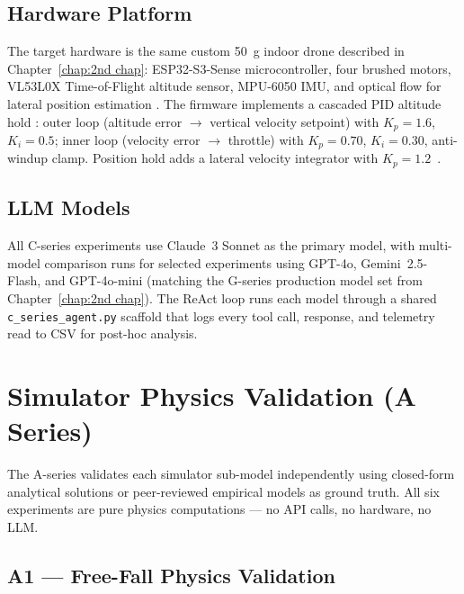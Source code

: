 \subsection{Hardware Platform}
\label{sec:ch3_setup_hw}

The target hardware is the same custom 50~g indoor drone described in
Chapter~\ref{chap:2nd chap}: ESP32-S3-Sense microcontroller, four brushed motors,
VL53L0X Time-of-Flight altitude sensor, MPU-6050 IMU, and optical flow for
lateral position estimation \cite{grzonka2012indoor}. The firmware implements a
cascaded PID altitude hold \cite{bouabdallah2004pid, narkhede2021althold}:
outer loop (altitude error $\to$ vertical velocity setpoint) with
$K_p=1.6$, $K_i=0.5$; inner loop (velocity error $\to$ throttle) with
$K_p=0.70$, $K_i=0.30$, anti-windup clamp. Position hold adds a
lateral velocity integrator with $K_p=1.2$~\cite{chadha2023poshold}.

\subsection{LLM Models}
\label{sec:ch3_setup_models}

All C-series experiments use Claude~3 Sonnet as the primary model, with
multi-model comparison runs for selected experiments using GPT-4o,
Gemini~2.5-Flash, and GPT-4o-mini (matching the G-series production model set
from Chapter~\ref{chap:2nd chap}). The ReAct loop \cite{yao2022react} runs
each model through a shared \texttt{c\_series\_agent.py} scaffold that logs
every tool call, response, and telemetry read to CSV for post-hoc analysis.


\section{Simulator Physics Validation (A Series)}
\label{sec:ch3_aseries}

The A-series validates each simulator sub-model independently using
closed-form analytical solutions or peer-reviewed empirical models as ground
truth. All six experiments are pure physics computations --- no API calls, no
hardware, no LLM.

\subsection{A1 --- Free-Fall Physics Validation}
\label{sec:ch3_a1}

